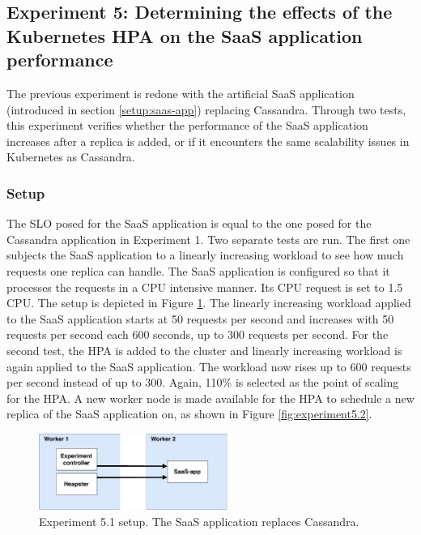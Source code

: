 \subsection{Experiment 5: Determining the effects of the Kubernetes HPA on the SaaS application performance}
The previous experiment is redone with the artificial SaaS application (introduced in section \ref{setup:saas-app}) replacing Cassandra. Through two tests, this experiment verifies whether the performance of the SaaS application increases after a replica is added, or if it encounters the same scalability issues in Kubernetes as Cassandra.  

\subsubsection{Setup}
The SLO posed for the SaaS application is equal to the one posed for the Cassandra application in Experiment 1. Two separate tests are run. The first one subjects the SaaS application to a linearly increasing workload to see how much requests one replica can handle. The SaaS application is configured so that it processes the requests in a CPU intensive manner. Its CPU request is set to 1.5 CPU. The setup is depicted in Figure \ref{fig:experiment5.1}. The linearly increasing workload applied to the SaaS application starts at 50 requests per second and increases with 50 requests per second each 600 seconds, up to 300 requests per second. For the second test, the HPA is added to the cluster and linearly increasing workload is again applied to the SaaS application. The workload now rises up to 600 requests per second instead of up to 300. Again, 110\% is selected as the point of scaling for the HPA. A new worker node is made available for the HPA to schedule a new replica of the SaaS application on, as shown in Figure \ref{fig:experiment5.2}. 

\setlength\abovecaptionskip{3pt}
\begin{figure}[H]
\centering
\includegraphics[width=0.55\textwidth]{Images/Experiments/Experiment_1_SaaS.pdf}
\caption{Experiment 5.1 setup. The SaaS application replaces Cassandra.}
\label{fig:experiment5.1}
\end{figure}

